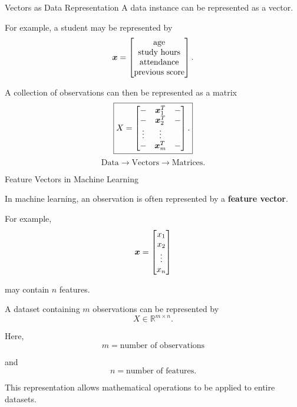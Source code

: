\begin{frame}{Vectors as Data Representation}
\vspace{-0.1cm}
A data instance can be represented as a vector.

For example, a student may be represented by
\vspace{-0.1cm}
\[
\bm{x}
=
\begin{bmatrix}
\text{age}\\
\text{study hours}\\
\text{attendance}\\
\text{previous score}
\end{bmatrix}.
\]

A collection of observations can then be represented
as a matrix
\vspace{-0.1cm}
\[
\boxed{
X=
\begin{bmatrix}
- & \bm{x}_1^T & -\\
- & \bm{x}_2^T & -\\
\vdots & \vdots & \\
- & \bm{x}_m^T & -
\end{bmatrix}.
}
\]
\vspace{-0.1cm}
\[
\boxed{
\text{Data}
\longrightarrow
\text{Vectors}
\longrightarrow
\text{Matrices}.
}
\]

\end{frame}



\begin{frame}{Feature Vectors in Machine Learning}

In machine learning, an observation is often represented
by a \textbf{feature vector}.

For example,
\vspace{-0.3cm}
\[
\bm{x}
=
\begin{bmatrix}
x_1\\
x_2\\
\vdots\\
x_n
\end{bmatrix}
\]

may contain $n$ features.

A dataset containing $m$ observations can be represented by
\vspace{-0.1cm}
\[
\boxed{
X\in\mathbb{R}^{m\times n}.
}
\]

Here,
\vspace{-0.1cm}
\[
m=\text{number of observations}
\]

\vspace{-0.1cm}

and
\vspace{-0.1cm}
\[
n=\text{number of features}.
\]

\vspace{-0.1cm}

This representation allows mathematical operations to be
applied to entire datasets.

\end{frame}


